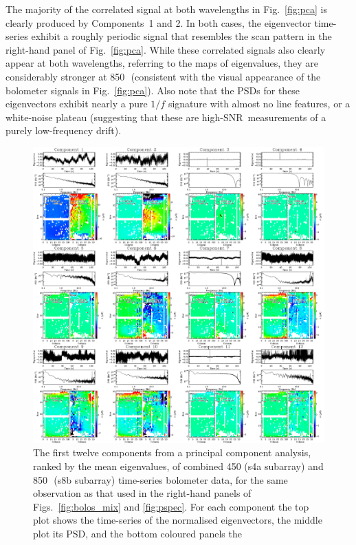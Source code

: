 \documentclass[useAMS,usenatbib,nofootinbib]{mn2e}
\newcommand{\snr}{SNR}
\begin{document}
The majority of the correlated signal at both wavelengths in
Fig.~\ref{fig:pca} is clearly produced by Components~1 and 2. In both
cases, the eigenvector time-series exhibit a roughly periodic signal
that resembles the scan pattern in the right-hand panel of
Fig.~\ref{fig:pca}. While these correlated signals also clearly appear
at both wavelengths, referring to the maps of eigenvalues, they are
considerably stronger at 850\,\micron\ (consistent with the visual
appearance of the bolometer signals in Fig.~\ref{fig:pca}). Also note
that the PSDs for these eigenvectors exhibit nearly a pure $1/f$
signature with almost no line features, or a white-noise plateau
(suggesting that these are high-\snr\ measurements of a purely
low-frequency drift).

\begin{figure}
\centering
\includegraphics[width=\linewidth]{pca.pdf}
\caption{The first twelve components from a principal component
  analysis, ranked by the mean eigenvalues, of combined 450 (s4a
  subarray) and 850\,\micron\ (s8b subarray) time-series bolometer
  data, for the same observation as that used in the right-hand panels
  of Figs.~\ref{fig:bolos_mix} and \ref{fig:pspec}. For each component
  the top plot shows the time-series of the normalised eigenvectors,
  the middle plot its PSD, and the bottom coloured panels the
}
\end{figure}
\end{document}
